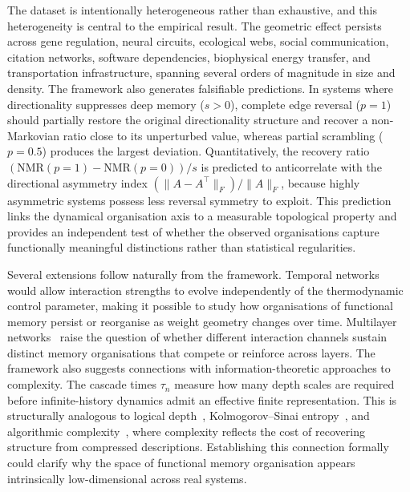 \documentclass[aps,superscriptaddress,11pt]{revtex4-2}
\newcommand{\NMR}{\mathrm{NMR}}
\theoremstyle{definition}
\theoremstyle{plain}
\begin{document}
The dataset is intentionally heterogeneous rather than exhaustive, and
this heterogeneity is central to the empirical result. The geometric
effect persists across gene regulation, neural circuits, ecological webs,
social communication, citation networks, software dependencies, biophysical
energy transfer, and transportation infrastructure, spanning several orders
of magnitude in size and density. The framework also generates falsifiable
predictions. In systems where directionality suppresses deep memory
($s > 0$), complete edge reversal ($p = 1$) should partially restore the
original directionality structure and recover a non-Markovian ratio close
to its unperturbed value, whereas partial scrambling ($p = 0.5$) produces
the largest deviation. Quantitatively, the recovery ratio
$(\NMR(p{=}1)-\NMR(p{=}0))/s$ is predicted to anticorrelate with the
directional asymmetry index $(\|A-A^\top\|_F)/\|A\|_F$, because highly
asymmetric systems possess less reversal symmetry to exploit. This
prediction links the dynamical organisation axis to a measurable
topological property and provides an independent test of whether the
observed organisations capture functionally meaningful distinctions rather
than statistical regularities.

Several extensions follow naturally from the framework. Temporal
networks~\cite{Holme2012} would allow interaction strengths to evolve
independently of the thermodynamic control parameter, making it possible
to study how organisations of functional memory persist or reorganise as
weight geometry changes over time. Multilayer
networks~\cite{Kivela2014,Moutuou2023} raise the question of whether
different interaction channels sustain distinct memory organisations that
compete or reinforce across layers. The framework also suggests connections
with information-theoretic approaches to complexity. The cascade times
$\tau_n$ measure how many depth scales are required before
infinite-history dynamics admit an effective finite representation. This is
structurally analogous to logical depth~\cite{Bennet1990},
Kolmogorov--Sinai entropy~\cite{Lloyd2001}, and algorithmic
complexity~\cite{Antunes2006}, where complexity reflects the cost of
recovering structure from compressed descriptions. Establishing this
connection formally could clarify why the space of functional memory
organisation appears intrinsically low-dimensional across real systems.

\end{document}

